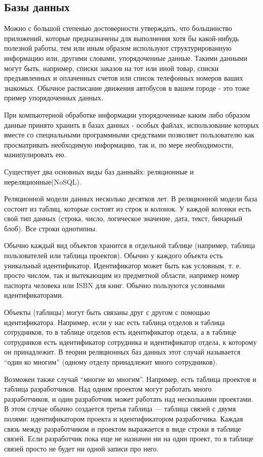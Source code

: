 \subsection{Базы данных}
\label{sec:analysis:db}

Можно с большой степенью достоверности утверждать, что большинство приложений, которые предназначены для выполнения хотя бы какой-нибудь полезной работы, тем или иным образом используют структурированную информацию или, другими словами, упорядоченные данные. Такими данными могут быть, например, списки заказов на тот или иной товар, списки предъявленных и оплаченных счетов или список телефонных номеров ваших знакомых. Обычное расписание движения автобусов в вашем городе - это тоже пример упорядоченных данных.

При компьютерной обработке информации упорядоченные каким либо образом данные принято хранить в базах данных - особых файлах, использование которых вместе со специальными программными средствами позволяет пользователю как просматривать необходимую информацию, так и, по мере необходимости, манипулировать ею.

Существует два основных виды баз данныйх: реляционные и нереляционные(NoSQL).

Реляционной модели данных несколько десятков лет. В реляционной модели база состоит из таблиц, которые состоят из строк и колонок. У каждой колонки есть свой тип данных (строка, число, логическое значение, дата, текст, бинарный блоб). Все строки однотипны.

Обычно каждый вид объектов хранится в отдельной таблице (например, таблица пользователей или таблица проектов). Обычно у каждого объекта есть уникальный идентификатор. Идентификатор может быть как условным, т. е. просто числом, так и вытекающим из предметной области, например номер паспорта человека или ISBN для книг. Обычно пользуются условными идентификаторами.

Объекты (таблицы) могут быть связаны друг с другом с помощью идентификатора. Например, если у нас есть таблица отделов и таблица сотрудников, то в таблице отделов есть идентификатор отдела, а в таблице сотрудников есть идентификатор сотрудника и идентификатор отдела, к которому он принадлежит. В теории реляционных баз данных этот случай называется “один ко многим” (одному отделу принадлежит много сотрудников).

Возможен также случай “многие ко многим”. Например, есть таблица проектов и таблица разработчиков. Над одним проектом могут работать много разработчиков, и один разработчик может работать над несколькими проектами. В этом случае обычно создается третья таблица — таблица связей с двумя полями: идентификатором проекта и идентификатором разработчика. Каждая связь между разработчиком и проектом выражается в виде строки в таблице связей. Если разработчик пока еще не назначен ни на один проект, то в таблице связей просто не будет ни одной записи про него.


